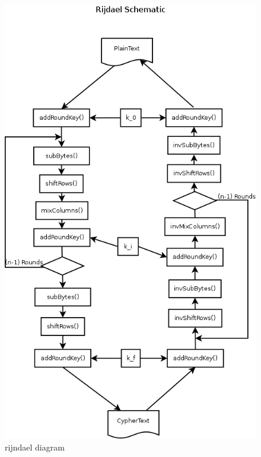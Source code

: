 \documentclass[10pt,a4paper,twoside]{llncs}
\begin{document}
\begin{figure}[ht]
 \centering
 \includegraphics[scale=0.3,keepaspectratio=true]{./images/rijndaelDiagram.png}
 \caption{rijndael diagram}
 \label{fig:RijndaelDiagram}
\end{figure}

\end{document}
